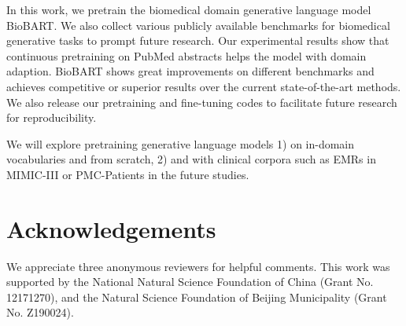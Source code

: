 \documentclass[11pt]{article}
\begin{document}
In this work, we pretrain the biomedical domain generative language model BioBART. We also collect various publicly available benchmarks for biomedical generative tasks to prompt future research. Our experimental results show that continuous pretraining on PubMed abstracts helps the model with domain adaption. BioBART shows great improvements on different benchmarks and achieves competitive or superior results over the current state-of-the-art methods. We also release our pretraining and fine-tuning codes to facilitate future research for reproducibility. 

We will explore pretraining generative language models 1) on in-domain vocabularies and from scratch, 2) and with clinical corpora such as EMRs in MIMIC-III \cite{Johnson2016MIMICIIIAF} or PMC-Patients \cite{zhao2022pmcpatients} in the future studies. 

\section*{Acknowledgements}
We appreciate three anonymous reviewers for helpful comments. This work was supported by the National Natural Science Foundation of China (Grant No. 12171270), and the Natural Science Foundation of Beijing Municipality (Grant No. Z190024).



\end{document}
